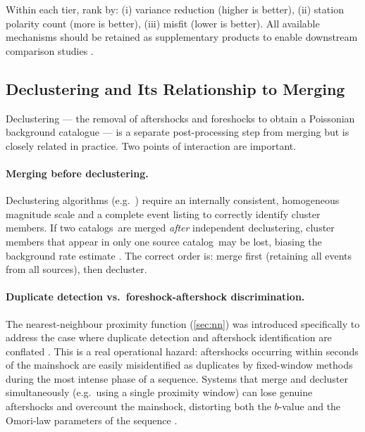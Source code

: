 \documentclass[12pt]{article}
\newcommand{\catalog}{catalog}
\newcommand{\catalogs}{catalogs}
\begin{document}
Within each tier, rank by: (i) variance reduction (higher is better),
(ii) station polarity count (more is better), (iii) misfit (lower is better).
All available mechanisms should be retained as supplementary products to
enable downstream comparison studies \citep{ISCBulletinRebuild2020}.

\subsection{Declustering and Its Relationship to Merging}
\label{sec:declustering}

Declustering — the removal of aftershocks and foreshocks to obtain a Poissonian
background catalogue — is a separate post-processing step from merging but is
closely related in practice.  Two points of interaction are important.

\paragraph{Merging before declustering.}
Declustering algorithms (e.g.\ \citealt{GardnerKnopoff1974, Reasenberg1985,
Zaliapin2013}) require an internally consistent, homogeneous magnitude scale and
a complete event listing to correctly identify cluster members.  If two \catalogs\
are merged \emph{after} independent declustering, cluster members that appear
in only one source \catalog\ may be lost, biasing the background rate estimate
\citep{Hainzl2016}.  The correct order is: merge first (retaining all events
from all sources), then decluster.

\paragraph{Duplicate detection vs.\ foreshock-aftershock discrimination.}
The nearest-neighbour proximity function (\cref{sec:nn}) was introduced
specifically to address the case where duplicate detection and aftershock
identification are conflated \citep{Tanaka2022}.  This is a real operational
hazard: aftershocks occurring within seconds of the mainshock are easily
misidentified as duplicates by fixed-window methods during the most intense
phase of a sequence.  Systems that merge and decluster simultaneously (e.g.\
using a single proximity window) can lose genuine aftershocks and overcount
the mainshock, distorting both the $b$-value and the Omori-law parameters of
the sequence \citep{Hainzl2016, Reasenberg1985}.
\end{document}
